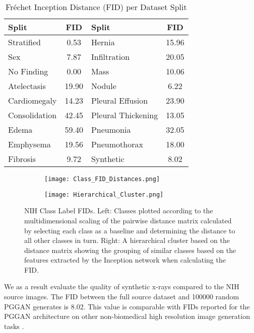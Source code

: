 \documentclass{article}
\begin{document}
\begin{table}[ht]
\centering \caption{Fréchet Inception Distance (FID) per Dataset Split} \begin{tabular}{l c l c} \hline\hline Split & FID & Split & FID\\ [0.5ex] \hline Stratified & 0.53 & Hernia & 15.96 \\
Sex & 7.87 & Infiltration & 20.05 \\
No Finding & 0.00 & Mass & 10.06 \\
Atelectasis & 19.90 & Nodule & 6.22 \\
Cardiomegaly & 14.23 & Pleural Effusion & 23.90 \\
Consolidation & 42.45 & Pleural Thickening & 13.05 \\
Edema & 59.40 & Pneumonia & 32.05 \\
Emphysema & 19.56 & Pneumothorax & 18.00 \\
Fibrosis & 9.72 & Synthetic & 8.02\\ [1ex] \hline \end{tabular}
\label{table:FIDs} 
\end{table}

\begin{figure}[!htb]
    \begin{subfigure}{0.5\textwidth}
    \texttt{[image: Class\_FID\_Distances.png]}
    \end{subfigure}
    \begin{subfigure}{0.\textwidth}
    \texttt{[image: Hierarchical\_Cluster.png]}
    \end{subfigure}
    
    \caption{NIH Class Label FIDs. Left: Classes plotted according to the multidimensional scaling of the pairwise distance matrix calculated by selecting each class as a baseline and determining the distance to all other classes in turn. Right: A hierarchical cluster based on the distance matrix showing the grouping of similar classes based on the features extracted by the Inception network when calculating the FID.}
    \label{fig:class-dist}
\end{figure}
We as a result evaluate the quality of synthetic x-rays compared to the NIH source images. The FID between the full source dataset and \num{100000} random PGGAN generates is \num{8.02}. This value is comparable with FIDs reported for the PGGAN architecture on other non-biomedical high resolution image generation tasks \cite{karrasProgressiveGrowingGANs2018}.
\end{document}
